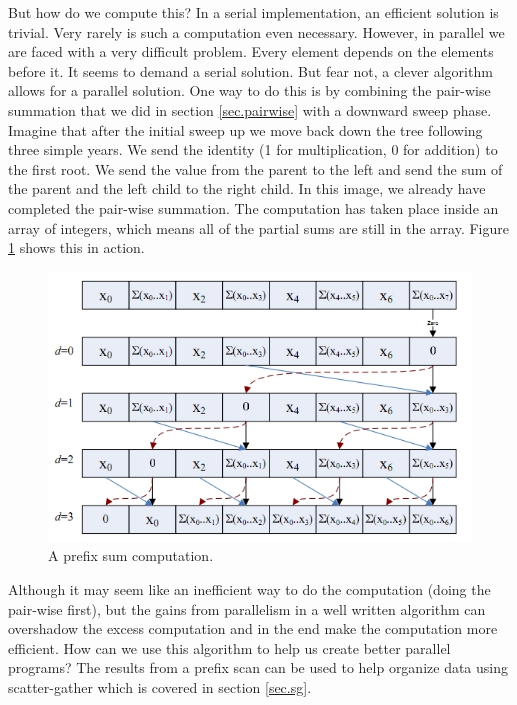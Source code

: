 \documentclass{article}
\begin{document}
    But how do we compute this? In a serial implementation, an efficient solution is trivial. Very rarely is such a computation even necessary. However, in parallel we are faced with a very difficult problem. Every element depends on the elements before it. It seems to demand a serial solution. But fear not, a clever algorithm allows for a parallel solution. One way to do this is by combining the pair-wise summation that we did in section \ref{sec.pairwise} with a downward sweep phase. Imagine that after the initial sweep up we move back down the tree following three simple years. We send the identity (1 for multiplication, 0 for addition) to the first root. We send the value from the parent to the left and send the sum of the parent and the left child to the right child. In this image, we already have completed the pair-wise summation. The computation has taken place inside an array of integers, which means all of the partial sums are still in the array. Figure \ref{fig.psc} shows this in action.

	\begin{figure}
		\label{fig.psc}
    \centering
    \includegraphics[scale=.65]{pic/PrefixSum.jpg}
    \caption{A prefix sum computation.}
    \end{figure}


    Although it may seem like an inefficient way to do the computation (doing the pair-wise first), but the gains from parallelism in a well written algorithm can overshadow the excess computation and in the end make the computation more efficient. How can we use this algorithm to help us create better parallel programs? The results from a prefix scan can be used to help organize data using scatter-gather which is covered in section \ref{sec.sg}.
\end{document}
